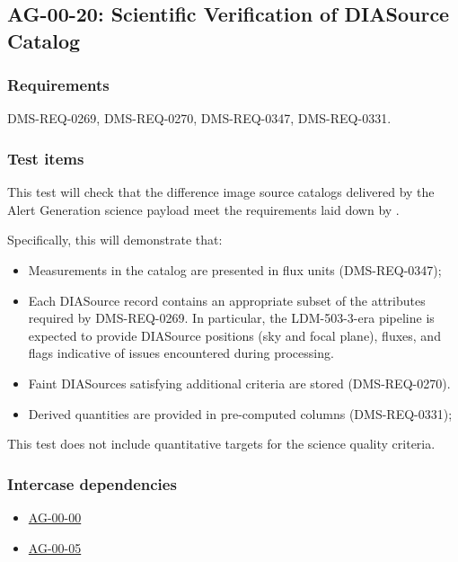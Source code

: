 \subsection{AG-00-20: Scientific Verification of DIASource Catalog}
\label{ag-00-20}

\subsubsection{Requirements}

DMS-REQ-0269, DMS-REQ-0270, DMS-REQ-0347, DMS-REQ-0331.

\subsubsection{Test items}
\label{ag-00-20-items}

This test will check that the difference image source catalogs
delivered by the Alert Generation science
payload meet the requirements laid down by .

Specifically, this will demonstrate that:

\begin{itemize}

  \item{Measurements in the catalog are presented in flux units (DMS-REQ-0347);}

  \item{Each DIASource record contains an appropriate subset of the attributes
  required by DMS-REQ-0269. In particular, the LDM-503-3-era pipeline is
  expected to provide DIASource positions (sky and focal plane), fluxes, and
  flags indicative of issues encountered during processing.}

  \item{Faint DIASources satisfying additional criteria are stored (DMS-REQ-0270).}

  \item{Derived quantities are provided in pre-computed columns (DMS-REQ-0331);}

\end{itemize}

This test does not include quantitative targets for the science quality criteria.

\subsubsection{Intercase dependencies}

\begin{itemize}

  \item{\hyperref[ag-00-00]{AG-00-00}}
  \item{\hyperref[ag-00-05]{AG-00-05}}

\end{itemize}

